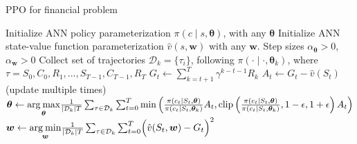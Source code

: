 \documentclass{article}
\begin{document}
\begin{algorithm}
    \caption{PPO for financial problem~\cite{SpinningUp2018}}
    \label{algorithm:ppo}
    \begin{algorithmic}[1]
        \State Initialize ANN policy parameterization
        \(\pi\left(c\middle|s, \bm{\theta}\right)\), with any \(\bm{\theta}\)
        \State Initialize ANN state-value function parameterization
        \(\hat{v}(s,\bm{w})\) with any \(\bm{w}\).
        \State Step sizes \(\alpha_{\bm{\theta}}>0\), \(\alpha_{\bm{w}}>0\)
        \State Collect set of trajectories \(\mathcal{D}_k=\{\tau_i\}\),
        following \(\pi\left(\cdot\middle|\cdot, \bm{\theta}_k\right)\), where
        \(\tau = S_0, C_0, R_1, ..., S_{T-1}, C_{T-1}, R_T\)
        \State \(G_t \gets \sum_{k=t+1}^{T} \gamma^{k-t-1}R_k\)
        \State \(A_t \gets G_t - \hat{v}(S_t)\)
        \EndFor
        \Loop \hspace{0.3mm} (update multiple times)\vspace{1mm}
        \State \(\bm{\theta} \gets \underset{\bm{\theta}}{\text{arg\:max}}
        \frac{1}{|\mathcal{D}_k|T}
        \sum_{\tau\in\mathcal{D}_k}^{} \sum_{t=0}^{T}
        \min{\left(
                \frac{\pi\left(c_t\middle|S_t, \bm{\theta}\right)}
                {\pi\left(c_t\middle|S_t, \bm{\theta}_k\right)}A_t,
                \text{clip}\left(
                    \frac{\pi\left(c_t\middle|S_t, \bm{\theta}\right)}
                    {\pi\left(c_t\middle|S_t, \bm{\theta}_k\right)},
                    1-\epsilon, 1+\epsilon
                \right)A_t
        \right)}\)
        \State \(\bm{w} \gets \underset{\bm{w}}{\text{arg\:min}}
        \frac{1}{|\mathcal{D}_k|T}\sum_{\tau\in\mathcal{D}_k}^{} \sum_{t=0}^{T}
        \Bigl(\hat{v}(S_t, \bm{w})-G_t\Bigr)^2\)
        \EndLoop
        \EndFor
    \end{algorithmic}
\end{algorithm}
\end{document}
